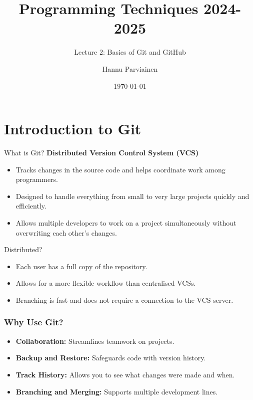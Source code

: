 \documentclass{beamer}
\title{Programming Techniques 2024-2025}
\subtitle{Lecture 2: Basics of Git and GitHub}
\author{Hannu Parviainen}
\institute{Universidad de la Laguna}
\date{\today}
\begin{document}
\begin{frame}
  \titlepage
\end{frame}

\section{Introduction to Git}
\begin{frame}
  \begin{block}{What is Git?}
    \textbf{Distributed Version Control System (VCS)} 
    \begin{itemize}
        \item Tracks changes in the source code and helps coordinate work among programmers.
        \item Designed to handle everything from small to very large projects quickly and efficiently. 
        \item Allows multiple developers to work on a project simultaneously without overwriting each other's changes. 
    \end{itemize}
  \end{block}

  \begin{block}{Distributed?}
  \justifying
  \begin{itemize}
      \item Each user has a full copy of the repository.
      \item Allows for a more flexible workflow than centralised VCSs.
      \item Branching is fast and does not require a connection to the VCS server.
  \end{itemize}
   \end{block}

\end{frame}


\begin{frame}
  \frametitle{Why Use Git?}
  \begin{itemize}
    \item \textbf{Collaboration:} Streamlines teamwork on projects.
    \item \textbf{Backup and Restore:} Safeguards code with version history.
    \item \textbf{Track History:} Allows you to see what changes were made and when.
    \item \textbf{Branching and Merging:} Supports multiple development lines.
  \end{itemize}
\end{frame}
\end{document}
